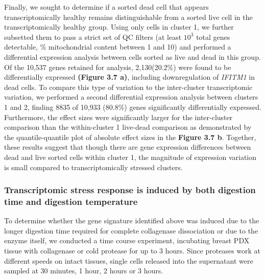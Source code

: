 Finally, we sought to determine if a sorted dead cell that appears transcriptomically healthy remains distinguishable from a sorted live cell in the transcriptomically healthy group. Using only cells in cluster 1, we further subsetted them to pass a strict set of QC filters (at least $10^3$ total genes detectable, \% mitochondrial content between 1 and 10) and performed a differential expression analysis between cells sorted as live and dead in this group. Of the 10,537 genes retained for analysis, 2,130(20.2\%) were found to be differentially expressed \textbf{(Figure 3.7 a)}, including downregulation of \emph{IFITM1} in dead cells. To compare this type of variation to the inter-cluster transcriptomic variation, we performed a second differential expression analysis between clusters 1 and 2, finding 8835 of 10,933 (80.8\%) genes significantly differentially expressed. Furthermore, the effect sizes were significantly larger for the inter-cluster comparison than the within-cluster 1 live-dead comparison as demonstrated by the quantile-quantile plot of absolute effect sizes in the \textbf{Figure 3.7 b}. Together, these results suggest that though there are gene expression differences between dead and live sorted cells within cluster 1, the magnitude of expression variation is small compared to transcriptomically stressed clusters.
 
 \subsubsection{Transcriptomic stress response is induced by both digestion time and digestion temperature}
To determine whether the gene signature identified above was induced due to the longer digestion time required for complete collagenase dissociation or due to the enzyme itself, we conducted a time course experiment, incubating breast PDX tissue with collagenase or cold protease for up to 3 hours. Since proteases work at different speeds on intact tissues, single cells released into the supernatant were sampled at 30 minutes, 1 hour, 2 hours or 3 hours.   
 

